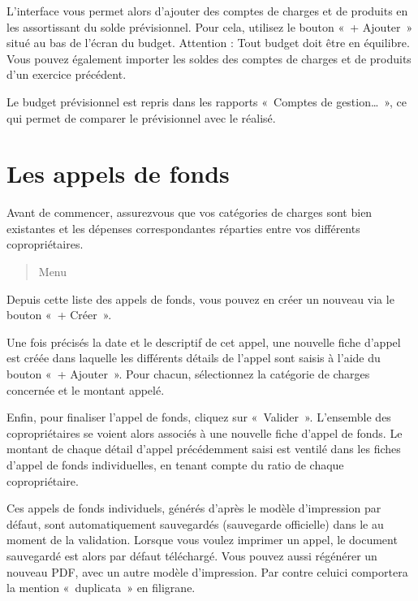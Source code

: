 \documentclass[a4paper,10pt,oneside,french]{sphinxmanual}
\begin{document}
\sphinxAtStartPar
L’interface vous permet alors d’ajouter des comptes de charges et de produits en les assortissant du solde prévisionnel. Pour cela, utilisez le bouton « + Ajouter » situé au bas de l’écran du budget. Attention : Tout budget doit être en équilibre.
Vous pouvez également importer les soldes des comptes de charges et de produits d’un exercice précédent.

\sphinxAtStartPar
Le budget prévisionnel est repris dans les rapports « Comptes de gestion… », ce qui permet de comparer le prévisionnel avec le réalisé.

\sphinxstepscope


\section{Les appels de fonds}
\label{\detokenize{condominium/call_of_funds:les-appels-de-fonds}}\label{\detokenize{condominium/call_of_funds::doc}}
\sphinxAtStartPar
Avant de commencer, assurez\sphinxhyphen{}vous que vos catégories de charges sont bien existantes et les dépenses correspondantes réparties entre vos différents copropriétaires.
\begin{quote}

\sphinxAtStartPar
Menu 
\end{quote}

\sphinxAtStartPar
Depuis cette liste des appels de fonds, vous pouvez en créer un nouveau via le bouton « + Créer ».

\sphinxAtStartPar
Une fois précisés la date et le descriptif de cet appel, une nouvelle fiche d’appel est créée dans laquelle les différents détails de l’appel sont saisis à l’aide du bouton « + Ajouter ». Pour chacun, sélectionnez la catégorie de charges concernée et le montant appelé.
\begin{quote}

\noindent{}
\end{quote}

\sphinxAtStartPar
Enfin, pour finaliser l’appel de fonds, cliquez sur « Valider ».
L’ensemble des copropriétaires se voient alors associés à une nouvelle fiche d’appel de fonds.
Le montant de chaque détail d’appel précédemment saisi est ventilé dans les fiches d’appel de fonds individuelles, en tenant compte du ratio de chaque copropriétaire.

\sphinxAtStartPar
Ces appels de fonds individuels, générés d’après le modèle d’impression par défaut, sont automatiquement sauvegardés (sauvegarde officielle) dans le  au moment de la validation.
Lorsque vous voulez imprimer un appel, le document sauvegardé est alors par défaut téléchargé.
Vous pouvez aussi régénérer un nouveau PDF, avec un autre modèle d’impression. Par contre celui\sphinxhyphen{}ci comportera la mention « duplicata » en filigrane.
\end{document}
